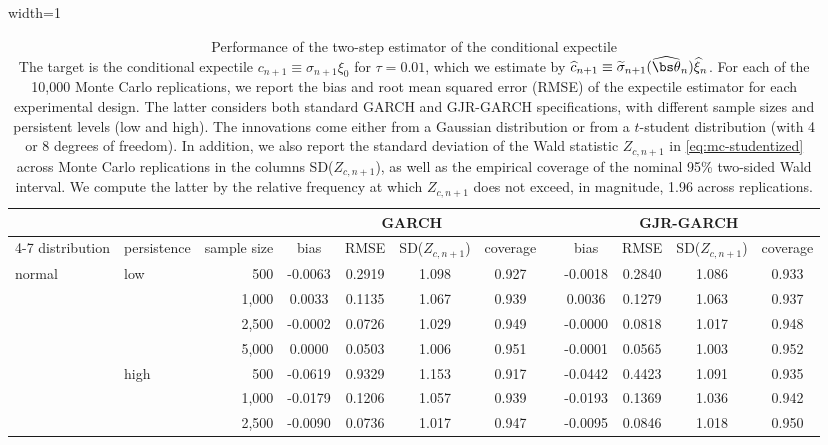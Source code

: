 \begin{table}[t]
\caption{Performance of the two-step estimator of the conditional expectile\\ {\footnotesize The target is the conditional expectile $c_{n+1}\equiv\sigma_{n+1}\xi_0$ for $\tau=0.01$, which we estimate by $\widehat{c}_{n+1}\equiv\widetilde\sigma_{n+1}(\widehat{\bs\theta}_n)\widehat{\xi}_n$. For each of the 10,000 Monte Carlo replications, we report the bias and root mean squared error (RMSE) of the expectile estimator for each experimental design. The latter considers both standard GARCH and GJR-GARCH specifications, with different sample sizes and persistent levels (low and high). The innovations come either from a Gaussian distribution or from a $t$-student distribution (with 4 or 8 degrees of freedom). In addition, we also report the standard deviation of the Wald statistic $Z_{c,n+1}$ in \eqref{eq:mc-studentized} across Monte Carlo replications in the columns SD($Z_{c,n+1}$), as well as the empirical coverage of the nominal 95\% two-sided Wald interval. We compute the latter by the relative frequency at which $Z_{c,n+1}$ does not exceed, in magnitude, 1.96 across replications.}}
\label{tab:mc-ce-wald-portrait-tau-0p01}
\begin{adjustbox}{width=1\textwidth}
\renewcommand{\arraystretch}{1.25}
\begin{tabular}{llr*{9}{c}}
\toprule
&&&\multicolumn{4}{c}{GARCH}&&\multicolumn{4}{c}{GJR-GARCH}\\
\cline{4-7}\cline{9-12}
distribution & persistence & sample size & bias & RMSE & SD($Z_{c,n+1}$) & coverage && bias & RMSE & SD($Z_{c,n+1}$) & coverage\\
\midrule
normal & low & 500 & -0.0063 & 0.2919 & 1.098 & 0.927 && -0.0018 & 0.2840 & 1.086 & 0.933\\
 &  & 1,000 & 0.0033 & 0.1135 & 1.067 & 0.939 && 0.0036 & 0.1279 & 1.063 & 0.937\\
 &  & 2,500 & -0.0002 & 0.0726 & 1.029 & 0.949 && -0.0000 & 0.0818 & 1.017 & 0.948\\
 &  & 5,000 & 0.0000 & 0.0503 & 1.006 & 0.951 && -0.0001 & 0.0565 & 1.003 & 0.952\\
\addlinespace[1pt]
 & high & 500 & -0.0619 & 0.9329 & 1.153 & 0.917 && -0.0442 & 0.4423 & 1.091 & 0.935\\
 &  & 1,000 & -0.0179 & 0.1206 & 1.057 & 0.939 && -0.0193 & 0.1369 & 1.036 & 0.942\\
 &  & 2,500 & -0.0090 & 0.0736 & 1.017 & 0.947 && -0.0095 & 0.0846 & 1.018 & 0.950\\

\end{tabular}
\end{adjustbox}
\end{table}
